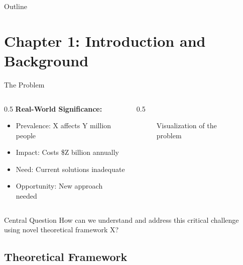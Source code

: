 \documentclass[aspectratio=169,12pt]{beamer}
\begin{document}
\begin{frame}{Outline}
  \tableofcontents
\end{frame}


\section{Chapter 1: Introduction and Background}

\begin{frame}{The Problem}
  \begin{columns}[T]

    \begin{column}{0.5\textwidth}
      \textbf{Real-World Significance:}
      \begin{itemize}
        \item Prevalence: X affects Y million people
        \item Impact: Costs \$Z billion annually
        \item Need: Current solutions inadequate
        \item Opportunity: New approach needed
      \end{itemize}
    \end{column}

    \begin{column}{0.5\textwidth}
      \begin{figure}
        \centering
        \caption{Visualization of the problem}
      \end{figure}
    \end{column}

  \end{columns}

  \vspace{0.5cm}

  \begin{alertblock}{Central Question}
    How can we understand and address this critical challenge using novel theoretical framework X?
  \end{alertblock}
\end{frame}

\subsection{Theoretical Framework}
\end{document}
